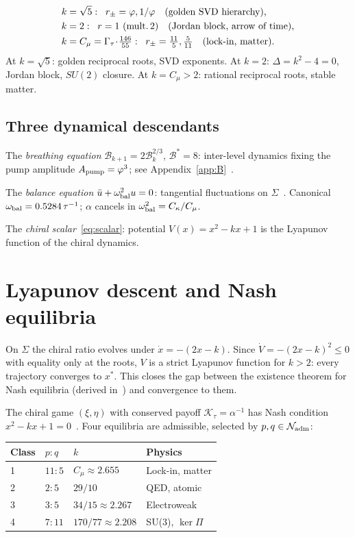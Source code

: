 \documentclass[twocolumn,10pt]{article}
\newcommand{\vp}{\varphi}
\newcommand{\Gt}{\Gamma_\tau}
\newcommand{\Nadm}{\mathcal{N}_{\rm adm}}
\newcommand{\Ktau}{\mathcal{K}_\tau}
\newcommand{\obal}{\omega_{\rm bal}}
\newcommand{\kerPi}{\ker\Pi}
\begin{document}
\begin{align}
  k &= \sqrt{5}:\;\; r_\pm=\vp,1/\vp
    \quad\text{(golden SVD hierarchy),}\\
  k &= 2:\;\; r=1\text{ (mult.\,2)}
    \quad\text{(Jordan block, arrow of time),}\\
  k &= C_\mu=\Gt\!\cdot\!\tfrac{146}{55}:\;\; r_\pm=\tfrac{11}{5},\tfrac{5}{11}
    \quad\text{(lock-in, matter).}
\end{align}
At $k=\sqrt{5}$: golden reciprocal roots, SVD exponents.
At $k=2$: $\Delta=k^2-4=0$, Jordan block, $SU(2)$ closure.
At $k=C_\mu>2$: rational reciprocal roots, stable matter.

\subsection{Three dynamical descendants}

The \textit{breathing equation}
$\mathcal{B}_{k+1}=2\mathcal{B}_k^{2/3}$, $\mathcal{B}^*=8$:
inter-level dynamics fixing the pump amplitude $A_{\rm pump}=\vp^3$;
see Appendix~\ref{app:B}~\cite{CamP05,CamP11}.

The \textit{balance equation}
$\ddot u + \obal^2 u = 0$: tangential fluctuations on $\Sigma$~\cite{CamP06}.
Canonical $\obal=0.5284\,\tau^{-1}$; $\alpha$ cancels in
$\obal^2=C_\kappa/C_\mu$.

The \textit{chiral scalar}~\eqref{eq:scalar}: potential
$V(x)=x^2-kx+1$ is the Lyapunov function of the chiral dynamics.

\section{Lyapunov descent and Nash equilibria}
\label{sec:lyapunov}

On $\Sigma$ the chiral ratio evolves under $\dot x=-(2x-k)$. Since
$\dot V=-(2x-k)^2\leq0$ with equality only at the roots, $V$ is a
strict Lyapunov function for $k>2$: every trajectory converges to
$x^*$. This closes the gap between the existence theorem for Nash
equilibria (derived in~\cite{CamP09}) and convergence to them.

The chiral game $(\xi,\eta)$ with conserved payoff $\Ktau=\alpha^{-1}$
has Nash condition $x^2-kx+1=0$~\cite{CamP09}. Four equilibria are
admissible, selected by $p,q\in\Nadm$:

\smallskip
\begin{center}
{\small\renewcommand{\arraystretch}{1.25}
\begin{tabular}{llll}
\toprule
Class & $p:q$ & $k$ & Physics \\
\midrule
1 & $11:5$ & $C_\mu\approx2.655$ & Lock-in, matter \\
2 & $2:5$  & $29/10$             & QED, atomic \\
3 & $3:5$  & $34/15\approx2.267$ & Electroweak \\
4 & $7:11$ & $170/77\approx2.208$& SU(3), $\kerPi$ \\
\bottomrule
\end{tabular}}
\end{center}
\smallskip
\end{document}
